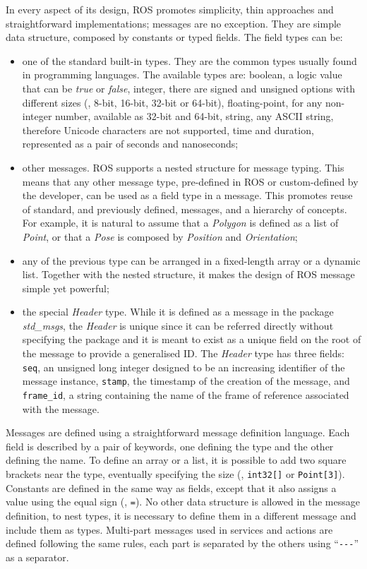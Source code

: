 In every aspect of its design, ROS promotes simplicity, thin approaches and straightforward implementations; messages are no exception. They are simple data structure, composed by constants or typed fields. The field types can be:
\begin{itemize}
\item one of the standard built-in types. They are the common types usually found in programming languages. The available types are: boolean, a logic value that can be \textit{true} or \textit{false}, integer, there are signed and unsigned options with different sizes (\ie, 8-bit, 16-bit, 32-bit or 64-bit), floating-point, for any non-integer number, available as 32-bit and 64-bit, string, any ASCII string, therefore Unicode characters are not supported, time and duration, represented as a pair of seconds and nanoseconds;
\item other messages. ROS supports a nested structure for message typing. This means that any other message type, pre-defined in ROS or custom-defined by the developer, can be used as a field type in a message. This promotes reuse of standard, and previously defined, messages, and a hierarchy of concepts. For example, it is natural to assume that a \textit{Polygon} is defined as a list of \textit{Point}, or that a \textit{Pose} is composed by \textit{Position} and \textit{Orientation};
\item any of the previous type can be arranged in a fixed-length array or a dynamic list. Together with the nested structure, it makes the design of ROS message simple yet powerful;
\item the special \textit{Header} type. While it is defined as a message in the package \textit{std\_msgs}, the \textit{Header} is unique since it can be referred directly without specifying the package and it is meant to exist as a unique field on the root of the message to provide a generalised ID. The \textit{Header} type has three fields: \texttt{seq}, an unsigned long integer designed to be an increasing identifier of the message instance, \texttt{stamp}, the timestamp of the creation of the message, and \texttt{frame\_id}, a string containing the name of the frame of reference associated with the message.
\end{itemize}

Messages are defined using a straightforward message definition language. Each field is described by a pair of keywords, one defining the type and the other defining the name. To define an array or a list, it is possible to add two square brackets near the type, eventually specifying the size (\eg, \texttt{int32[]} or \texttt{Point[3]}). Constants are defined in the same way as fields, except that it also assigns a value using the equal sign (\ie, \texttt{=}). No other data structure is allowed in the message definition, to nest types, it is necessary to define them in a different message and include them as types. Multi-part messages used in services and actions are defined following the same rules, each part is separated by the others using ``\texttt{-{}-{}-}'' as a separator.

